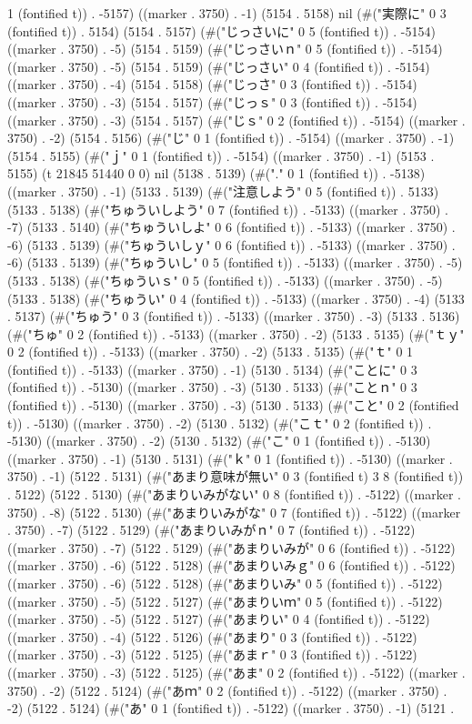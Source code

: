 {{1 (fontified t)) . -5157) ((marker . 3750) . -1) (5154 . 5158) nil (#("実際に" 0 3 (fontified t)) . 5154) (5154 . 5157) (#("じっさいに" 0 5 (fontified t)) . -5154) ((marker . 3750) . -5) (5154 . 5159) (#("じっさいｎ" 0 5 (fontified t)) . -5154) ((marker . 3750) . -5) (5154 . 5159) (#("じっさい" 0 4 (fontified t)) . -5154) ((marker . 3750) . -4) (5154 . 5158) (#("じっさ" 0 3 (fontified t)) . -5154) ((marker . 3750) . -3) (5154 . 5157) (#("じっｓ" 0 3 (fontified t)) . -5154) ((marker . 3750) . -3) (5154 . 5157) (#("じｓ" 0 2 (fontified t)) . -5154) ((marker . 3750) . -2) (5154 . 5156) (#("じ" 0 1 (fontified t)) . -5154) ((marker . 3750) . -1) (5154 . 5155) (#("ｊ" 0 1 (fontified t)) . -5154) ((marker . 3750) . -1) (5153 . 5155) (t 21845 51440 0 0) nil (5138 . 5139) (#("." 0 1 (fontified t)) . -5138) ((marker . 3750) . -1) (5133 . 5139) (#("注意しよう" 0 5 (fontified t)) . 5133) (5133 . 5138) (#("ちゅういしよう" 0 7 (fontified t)) . -5133) ((marker . 3750) . -7) (5133 . 5140) (#("ちゅういしよ" 0 6 (fontified t)) . -5133) ((marker . 3750) . -6) (5133 . 5139) (#("ちゅういしｙ" 0 6 (fontified t)) . -5133) ((marker . 3750) . -6) (5133 . 5139) (#("ちゅういし" 0 5 (fontified t)) . -5133) ((marker . 3750) . -5) (5133 . 5138) (#("ちゅういｓ" 0 5 (fontified t)) . -5133) ((marker . 3750) . -5) (5133 . 5138) (#("ちゅうい" 0 4 (fontified t)) . -5133) ((marker . 3750) . -4) (5133 . 5137) (#("ちゅう" 0 3 (fontified t)) . -5133) ((marker . 3750) . -3) (5133 . 5136) (#("ちゅ" 0 2 (fontified t)) . -5133) ((marker . 3750) . -2) (5133 . 5135) (#("ｔｙ" 0 2 (fontified t)) . -5133) ((marker . 3750) . -2) (5133 . 5135) (#("ｔ" 0 1 (fontified t)) . -5133) ((marker . 3750) . -1) (5130 . 5134) (#("ことに" 0 3 (fontified t)) . -5130) ((marker . 3750) . -3) (5130 . 5133) (#("ことｎ" 0 3 (fontified t)) . -5130) ((marker . 3750) . -3) (5130 . 5133) (#("こと" 0 2 (fontified t)) . -5130) ((marker . 3750) . -2) (5130 . 5132) (#("こｔ" 0 2 (fontified t)) . -5130) ((marker . 3750) . -2) (5130 . 5132) (#("こ" 0 1 (fontified t)) . -5130) ((marker . 3750) . -1) (5130 . 5131) (#("ｋ" 0 1 (fontified t)) . -5130) ((marker . 3750) . -1) (5122 . 5131) (#("あまり意味が無い" 0 3 (fontified t) 3 8 (fontified t)) . 5122) (5122 . 5130) (#("あまりいみがない" 0 8 (fontified t)) . -5122) ((marker . 3750) . -8) (5122 . 5130) (#("あまりいみがな" 0 7 (fontified t)) . -5122) ((marker . 3750) . -7) (5122 . 5129) (#("あまりいみがｎ" 0 7 (fontified t)) . -5122) ((marker . 3750) . -7) (5122 . 5129) (#("あまりいみが" 0 6 (fontified t)) . -5122) ((marker . 3750) . -6) (5122 . 5128) (#("あまりいみｇ" 0 6 (fontified t)) . -5122) ((marker . 3750) . -6) (5122 . 5128) (#("あまりいみ" 0 5 (fontified t)) . -5122) ((marker . 3750) . -5) (5122 . 5127) (#("あまりいｍ" 0 5 (fontified t)) . -5122) ((marker . 3750) . -5) (5122 . 5127) (#("あまりい" 0 4 (fontified t)) . -5122) ((marker . 3750) . -4) (5122 . 5126) (#("あまり" 0 3 (fontified t)) . -5122) ((marker . 3750) . -3) (5122 . 5125) (#("あまｒ" 0 3 (fontified t)) . -5122) ((marker . 3750) . -3) (5122 . 5125) (#("あま" 0 2 (fontified t)) . -5122) ((marker . 3750) . -2) (5122 . 5124) (#("あｍ" 0 2 (fontified t)) . -5122) ((marker . 3750) . -2) (5122 . 5124) (#("あ" 0 1 (fontified t)) . -5122) ((marker . 3750) . -1) (5121 . }}
